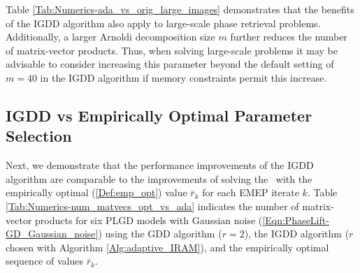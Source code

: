 

Table \ref{Tab:Numerics-ada_vs_orig_large_images} demonstrates that the benefits of the IGDD algorithm also apply to large-scale phase retrieval problems.
Additionally, a larger Arnoldi decomposition size $m$ further reduces the number of matrix-vector products.
Thus, when solving large-scale problems it may be advisable to consider increasing this parameter beyond the default setting of $m=40$ in the IGDD algorithm if memory constraints permit this increase.




\subsection{IGDD vs Empirically Optimal Parameter Selection}	\label{Subsec:Numerics-perf_results_emp_optimal}

Next, we demonstrate that the performance improvements of the IGDD algorithm are comparable to the improvements of solving the \emep \ with the empirically optimal (\ref{Def:emp_opt}) value $\bar{r}_k$ for each EMEP iterate $k$.
Table \ref{Tab:Numerics-num_matvecs_opt_vs_ada} indicates the number of matrix-vector products for six PLGD models with Gaussian noise (\ref{Eqn:PhaseLift-GD_Gaussian_noise}) using the GDD algorithm ($r=2$), the IGDD algorithm ($r$ chosen with Algorithm \ref{Alg:adaptive_IRAM}), and the empirically optimal sequence of values $\bar{r}_k$.



